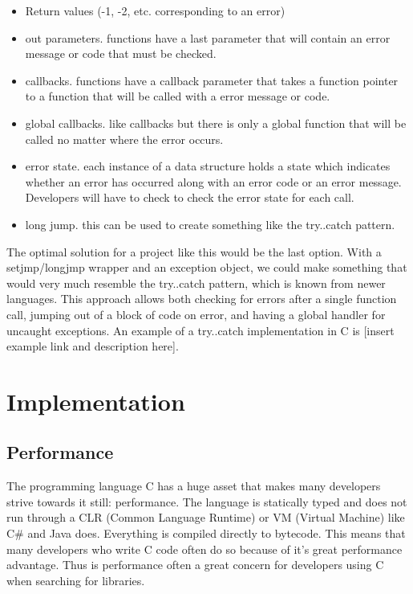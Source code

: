 \documentclass[table]{ituthesis}
\begin{document}
\begin{itemize}
	\item Return values (-1, -2, etc. corresponding to an error)
	\item out parameters. functions have a last parameter that will contain an error message or code that must be checked.
	\item callbacks. functions have a callback parameter that takes a function pointer to a function that will be called with a error message or code.
	\item global callbacks. like callbacks but there is only a global function that will be called no matter where the error occurs.
	\item error state. each instance of a data structure holds a state which indicates whether an error has occurred along with an error code or an error message. Developers will have to check to check the error state for each call.
	\item long jump. this can be used to create something like the try..catch pattern.
\end{itemize}

The optimal solution for a project like this would be the last option. With a setjmp/longjmp wrapper and an exception object, we could make something that would very much resemble the try..catch pattern, which is known from newer languages. This approach allows both checking for errors after a single function call, jumping out of a block of code on error, and having a global handler for uncaught exceptions. An example of a try..catch implementation in C is [insert example link and description here].

\chapter{Implementation}

\section{Performance}

The programming language C has a huge asset that makes many developers strive towards it still: performance. The language is statically typed and does not run through a CLR (Common Language Runtime) or VM (Virtual Machine) like C\# and Java does. Everything is compiled directly to bytecode. This means that many developers who write C code often do so because of it's great performance advantage. Thus is performance often a great concern for developers using C when searching for libraries. 
\end{document}
